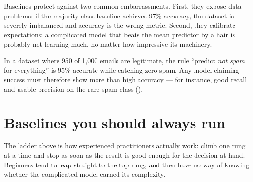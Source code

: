 Baselines protect against two common embarrassments. First, they expose data problems: if the majority-class baseline achieves 97\% accuracy, the dataset is severely imbalanced and accuracy is the wrong metric. Second, they calibrate expectations: a complicated model that beats the mean predictor by a hair is probably not learning much, no matter how impressive its machinery.

\begin{workedexample}
In a dataset where 950 of 1{,}000 emails are legitimate, the rule ``predict \emph{not spam} for everything'' is 95\% accurate while catching zero spam. Any model claiming success must therefore show more than high accuracy --- for instance, good recall and usable precision on the rare spam class ().
\end{workedexample}

\section{Baselines you should always run}

\begin{mlfigure}
\end{mlfigure}

\begin{analogy}
The ladder above is how experienced practitioners actually work: climb one rung at a time and stop as soon as the result is good enough for the decision at hand. Beginners tend to leap straight to the top rung, and then have no way of knowing whether the complicated model earned its complexity.
\end{analogy}


